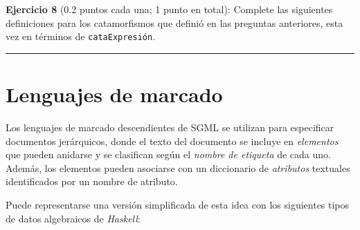 \textbf{Ejercicio 8} (0.2 puntos cada una; 1 punto en total): Complete
las siguientes definiciones para los catamorfismos que definió en las
preguntas anteriores, esta vez en términos de \texttt{cataExpresión}.

\begin{Shaded}
\begin{Highlighting}[]

                   \FunctionTok{=}  \FunctionTok{+} \FunctionTok{+} 
      


               \FunctionTok{=}  \FunctionTok{+} 
\end{Highlighting}
\end{Shaded}

\begin{center}\rule{3in}{0.4pt}\end{center}

\section{Lenguajes de marcado}\label{lenguajes-de-marcado}

Los lenguajes de marcado descendientes de SGML se utilizan para
especificar documentos jerárquicos, donde el texto del documento se
incluye en \emph{elementos} que pueden anidarse y se clasifican según el
\emph{nombre de etiqueta} de cada uno. Además, los elementos pueden
asociarse con un diccionario de \emph{atributos} textuales identificados
por un nombre de atributo.

Puede representarse una versión simplificada de esta idea con los
siguientes tipos de datos algebraicos de \emph{Haskell}:

